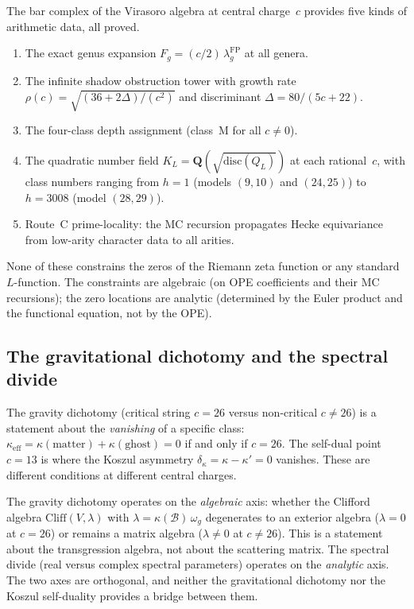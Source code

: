 \documentclass[11pt]{article}
\newcommand{\cB}{\mathcal{B}}
\begin{document}
The bar complex of the Virasoro algebra at central charge~$c$
provides five kinds of arithmetic data, all proved.

\begin{enumerate}
\item The exact genus expansion
$F_g = (c/2)\,\lambda_g^{\mathrm{FP}}$ at all genera.
\item The infinite shadow obstruction tower with growth rate
$\rho(c) = \sqrt{(36 + 2\Delta)/(c^2)}$ and discriminant
$\Delta = 80/(5c{+}22)$.
\item The four-class depth assignment (class~M for all
$c \neq 0$).
\item The quadratic number field
$K_L = \mathbf{Q}(\sqrt{\mathrm{disc}(Q_L)})$ at each
rational~$c$, with class numbers ranging from $h = 1$
(models $(9,10)$ and $(24,25)$) to $h = 3008$ (model $(28,29)$).
\item Route~C prime-locality: the MC recursion propagates
Hecke equivariance from low-arity character data to all
arities.
\end{enumerate}

None of these constrains the zeros of the Riemann zeta function
or any standard $L$-function.  The constraints are algebraic
(on OPE coefficients and their MC recursions); the zero
locations are analytic (determined by the Euler product and the
functional equation, not by the OPE).

\subsection{The gravitational dichotomy and the spectral divide}

The gravity dichotomy (critical string $c = 26$ versus
non-critical $c \neq 26$) is a statement about the
\emph{vanishing} of a specific class:
$\kappa_{\mathrm{eff}} = \kappa(\mathrm{matter})
+ \kappa(\mathrm{ghost}) = 0$ if and only if $c = 26$.
The self-dual point $c = 13$ is where the Koszul asymmetry
$\delta_\kappa = \kappa - \kappa' = 0$ vanishes.  These are
different conditions at different central charges.

The gravity dichotomy operates on the \emph{algebraic} axis:
whether the Clifford algebra $\mathrm{Cliff}(V, \lambda)$
with $\lambda = \kappa(\cB)\,\omega_g$ degenerates to an
exterior algebra ($\lambda = 0$ at $c = 26$) or remains a
matrix algebra ($\lambda \neq 0$ at $c \neq 26$).  This is a
statement about the transgression algebra, not about the
scattering matrix.  The spectral divide (real versus complex
spectral parameters) operates on the \emph{analytic} axis.
The two axes are orthogonal, and neither the gravitational
dichotomy nor the Koszul self-duality provides a bridge between
them.
\end{document}
